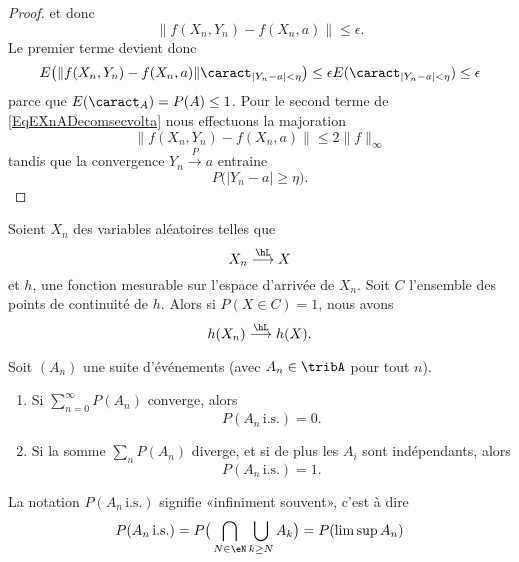\begin{proof}
    et donc
    \begin{equation}
        \| f(X_n,Y_n)-f(X_n,a) \|\leq \epsilon.
    \end{equation}
    Le premier terme devient donc
    \begin{equation}
        E\big( \| f(X_n,Y_n)-f(X_n,a) \|\caract_{| Y_n-a |<\eta} \big)\leq \epsilon E(\caract_{| Y_n-a |<\eta})\leq \epsilon
    \end{equation}
    parce que \( E(\caract_A)=P(A)\leq 1\). Pour le second terme de \eqref{EqEXnADecomsecvolta} nous effectuons la majoration
    \begin{equation}
        \| f(X_n,Y_n)-f(X_n,a) \|\leq 2\| f \|_{\infty}
    \end{equation}
    tandis que la convergence \( Y_n\stackrel{P}{\longrightarrow} a\) entraine 
    \begin{equation}
        P\big( | Y_n-a |\geq \eta \big).
    \end{equation}
\end{proof}

\begin{proposition}     \label{PropcvLsousfonc}
    Soient \( X_n\) des variables aléatoires telles que
    \begin{equation}
        X_n\stackrel{\hL}{\longrightarrow} X
    \end{equation}
    et \( h\), une fonction mesurable sur l'espace d'arrivée de \( X_n\). Soit \( C\) l'ensemble des points de continuité de \( h\). Alors si \( P(X\in C)=1\), nous avons 
    \begin{equation}
        h(X_n)\stackrel{\hL}{\longrightarrow}h(X).
    \end{equation}
\end{proposition}

\begin{lemma}
    Soit \( (A_n)\) une suite d'événements (avec \( A_n\in\tribA\) pour tout \( n\)).
    \begin{enumerate}
        \item
            Si \( \sum_{n=0}^{\infty}P(A_n)\) converge, alors
            \begin{equation}
                P(A_n\,\text{i.s.})=0.
            \end{equation}
        \item
            Si la somme \( \sum_nP(A_n)\) diverge, et si de plus les \( A_i\) sont indépendants, alors
            \begin{equation}
                P(A_n\,\text{i.s.})=1.
            \end{equation}
    \end{enumerate}
\end{lemma}
La notation \( P(A_n\,\text{i.s.})\) signifie «infiniment souvent», c'est à dire
\begin{equation}
    P(A_n\,\text{i.s.})=P\big( \bigcap_{N\in\eN}\bigcup_{k\geq N}A_k \big)=P(\limsup A_n)
\end{equation}

